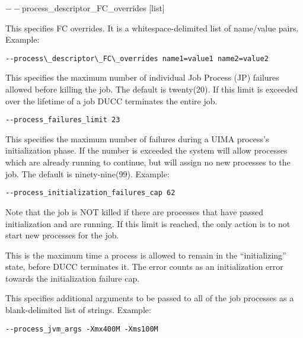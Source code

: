 \begin{description}
           \begin{sloppypar}             
           \item[$--$process\_descriptor\_FC\_overrides {[list]}  ]

             This specifies FC overrides. It is a whitespace-delimited list of name/value pairs. Example: 
             \begin{verbatim}
--process\_descriptor\_FC\_overrides name1=value1 name2=value2 
             \end{verbatim}
           \end{sloppypar}             
           
           \item[$--$process\_failures\_limit {[integer]} ]

             This specifies the maximum number of individual Job Process (JP) failures allowed
             before killing the job. The default is twenty(20). If this limit is exceeded over the lifetime 
             of a job DUCC terminates the entire job. 
             \begin{verbatim}
--process_failures_limit 23
\end{verbatim}
                          
           \item[$--$process\_initialization\_failures\_cap {[integer]} ] This specifies the maximum
             number of failures during a UIMA process's initialization phase.  If the number is
             exceeded the system will allow processes which are already running to continue, but
             will assign no new processes to the job.  The default is ninety-nine(99). Example:
             \begin{verbatim}
--process_initialization_failures_cap 62 
             \end{verbatim}
             
             Note that the job is NOT killed if there are processes that have passed initialization and are 
             running. If this limit is reached, the only action is to not start new processes for the job. 

           \item[$--$process\_initialization\_time\_max {[integer]}] This is the maximum time a process
             is allowed to remain in the ``initializing'' state, before DUCC terminates it.  The error
             counts as an initialization error towards the initialization failure cap.

           \item[$--$process\_jvm\_args {[list]} ] This specifies additional arguments to be passed to
             all of the job processes as a blank-delimited list of strings. Example:
             \begin{verbatim}
--process_jvm_args -Xmx400M -Xms100M
             \end{verbatim}


\end{description}

